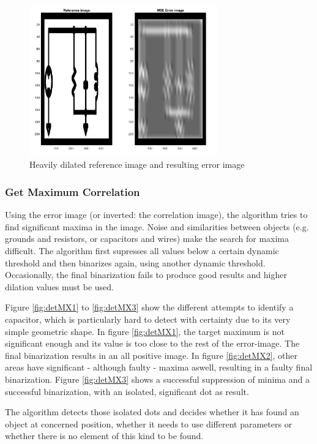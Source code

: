 \documentclass[10pt,twocolumn,letterpaper]{article}
\begin{document}
\begin{figure}[!ht]
\includegraphics[width = 3.2in]{img/detSW2.png}
\caption{Heavily dilated reference image and resulting error image}
\label{fig:detSW2}
\end{figure}

\subsubsection*{Get Maximum Correlation}

Using the error image (or inverted: the correlation image), the algorithm tries to find significant maxima in the image. Noise and similarities between objects (e.g. grounds and resistors, or capacitors and wires) make the search for maxima difficult. The algorithm first supresses all values below a certain dynamic threshold and then binarizes again, using another dynamic threshold. Occasionally, the final binarization fails to produce good results and higher dilation values must be used. 
\par
Figure \ref{fig:detMX1} to \ref{fig:detMX3} show the different attempts to identify a capacitor, which is particularly hard to detect with certainty due to its very simple geometric shape. In figure \ref{fig:detMX1}, the target maximum is not significant enough and its value is too close to the rest of the error-image. The final binarization results in an all positive image. In figure \ref{fig:detMX2}, other areas have significant - although faulty - maxima aswell, resulting in a faulty final binarization. Figure \ref{fig:detMX3} shows a successful suppression of minima and a successful binarization, with an isolated, significant dot as result. 
\par
The algorithm detects those isolated dots and decides whether it has found an object at concerned position, whether it needs to use different parameters or whether there is no element of this kind to be found.
\par
\end{document}
